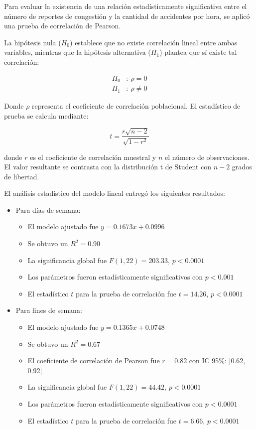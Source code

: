 \documentclass[12pt]{article}
\begin{document}
Para evaluar la existencia de una relación estadísticamente significativa entre el número de reportes de congestión y la cantidad de accidentes por hora, se aplicó una prueba de correlación de Pearson.

La hipótesis nula ($H_0$) establece que no existe correlación lineal entre ambas variables, mientras que la hipótesis alternativa ($H_1$) plantea que sí existe tal correlación:

\begin{align}
H_0&:\ \rho = 0 \\
H_1&:\ \rho \ne 0
\end{align}

Donde $\rho$ representa el coeficiente de correlación poblacional. El estadístico de prueba se calcula mediante:

\begin{equation}
t = \frac{r \sqrt{n - 2}}{\sqrt{1 - r^2}}
\end{equation}

donde $r$ es el coeficiente de correlación muestral y $n$ el número de observaciones. El valor resultante se contrasta con la distribución t de Student con $n - 2$ grados de libertad.

El análisis estadístico del modelo lineal entregó los siguientes resultados:

\begin{itemize}
    \item Para días de semana:
    \begin{itemize}
        \item El modelo ajustado fue $y = 0.1673x + 0.0996$
        \item Se obtuvo un $R^2 = 0.90$
        \item La significancia global fue $F(1, 22) = 203.33$, $p < 0.0001$
        \item Los parámetros fueron estadísticamente significativos con $p < 0.001$
        \item El estadístico $t$ para la prueba de correlación fue $t = 14.26$, $p < 0.0001$
    \end{itemize}

    \item Para fines de semana:
    \begin{itemize}
        \item El modelo ajustado fue $y = 0.1365x + 0.0748$
        \item Se obtuvo un $R^2 = 0.67$
        \item El coeficiente de correlación de Pearson fue $r = 0.82$ con IC 95\%: [0.62, 0.92]
        \item La significancia global fue $F(1, 22) = 44.42$, $p < 0.0001$
        \item Los parámetros fueron estadísticamente significativos con $p < 0.0001$
        \item El estadístico $t$ para la prueba de correlación fue $t = 6.66$, $p < 0.0001$
    \end{itemize}
\end{itemize}
\end{document}
